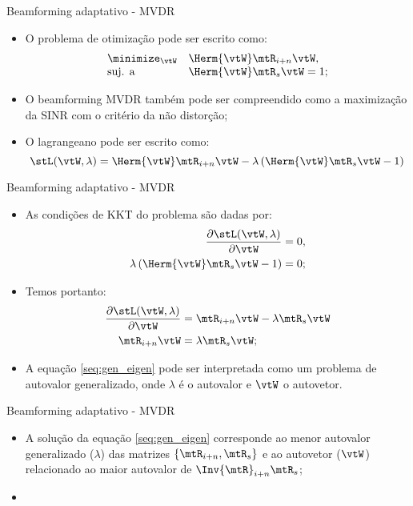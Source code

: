 \begin{frame}{Beamforming adaptativo - MVDR}
	\begin{itemize}
		\item O problema de otimização pode ser escrito como:
		\begin{equation}
			\label{eq:util_max}
			\begin{array}{ll}
				\minimize_\vtW & \Herm{\vtW}\mtR_{i+n}\vtW, \\
				\text{suj. a} & \Herm{\vtW}\mtR_{s}\vtW = 1;
			\end{array}
		\end{equation}
		\item O beamforming MVDR também pode ser compreendido como a maximização da SINR com o critério da não distorção;
		\item O lagrangeano pode ser escrito como:
		\begin{equation}
		  \stL(\vtW,\lambda) = \Herm{\vtW}\mtR_{i+n}\vtW - \lambda\left(\Herm{\vtW}\mtR_{s}\vtW - 1\right)
		\end{equation}
	\end{itemize}
\end{frame}

\begin{frame}{Beamforming adaptativo - MVDR}
	\begin{itemize}
		\item As condições de KKT do problema são dadas por:
		\begin{align}
		  \frac{\partial\stL(\vtW,\lambda)}{\partial\vtW} &= 0,\\
		  \lambda\left(\Herm{\vtW}\mtR_{s}\vtW - 1\right) &= 0;
		\end{align}
		\item Temos portanto:
		\begin{align}
		  \frac{\partial\stL(\vtW,\lambda)}{\partial\vtW} &= \mtR_{i+n}\vtW - \lambda\mtR_s\vtW\\
		  \mtR_{i+n}\vtW &= \lambda\mtR_s\vtW\label{seq:gen_eigen};
		\end{align}
		\item A equação \eqref{seq:gen_eigen} pode ser interpretada como um problema de autovalor generalizado, onde $\lambda$ é o autovalor e  $\vtW$ o autovetor.
	\end{itemize}
\end{frame}

\begin{frame}{Beamforming adaptativo - MVDR}
	\begin{itemize}
		\item A solução da equação \eqref{seq:gen_eigen} corresponde ao menor autovalor generalizado ($\lambda$) das matrizes $\{\mtR_{i+n},\mtR_s\}$ e ao autovetor ($\vtW$) relacionado ao maior autovalor de $\Inv{\mtR}_{i+n}\mtR_s$;
		\item 
	\end{itemize}
\end{frame}